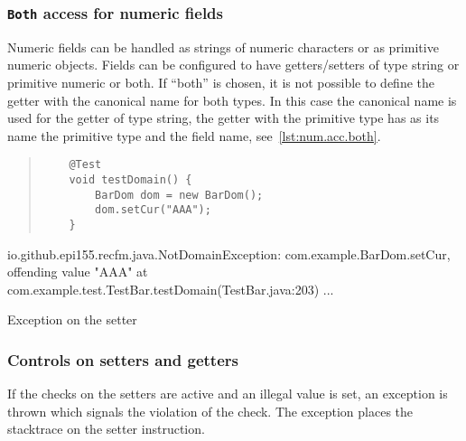 \subsubsection*{\texttt{Both} access for numeric fields}
Numeric fields can be handled as strings of numeric characters or as primitive 
numeric objects. Fields can be configured to have getters/setters of type string 
or primitive numeric or both. 
If ``both'' is chosen, it is not possible to define the getter with the 
canonical name for both types. 
In this case the canonical name is used for the getter of type string, 
the getter with the primitive type has as its name the primitive type and the 
field name, see~\ref{lst:num.acc.both}.

\begin{elisting}[!htb]
\begin{quote}
\begin{verbatim}
    @Test
    void testDomain() {
        BarDom dom = new BarDom();
        dom.setCur("AAA");
    }
\end{verbatim}
\end{quote}
\vspace*{-1cm}
\begin{javacode}
io.github.epi155.recfm.java.NotDomainException: com.example.BarDom.setCur, offending value "AAA"
	at com.example.test.TestBar.testDomain(TestBar.java:203)
	...
\end{javacode}
\caption{Exception on the setter}
\label{lst:set.throw}
\end{elisting}

\subsubsection*{Controls on setters and getters}
If the checks on the setters are active and an illegal value is set, an 
exception is thrown which signals the violation of the check. The exception 
places the stacktrace on the setter instruction.

